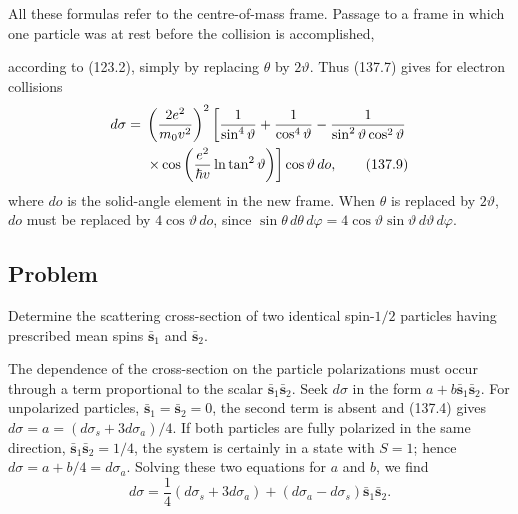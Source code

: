 All these formulas refer to the centre-of-mass frame. Passage to a frame in which one particle was at rest before the collision is accomplished,

according to (123.2), simply by replacing $\theta$ by $2\vartheta$. Thus (137.7) gives for electron collisions
\begin{align}
 d\sigma={}&\left(\frac{2e^2}{m_0v^2}\right)^2
 \left[\frac1{\sin^4\vartheta}+\frac1{\cos^4\vartheta}
 -\frac1{\sin^2\vartheta\cos^2\vartheta}\right.\notag\\
 &\left.\times\cos\left(\frac{e^2}{\hbar v}\ln\tan^2\vartheta\right)\right]
 \cos\vartheta\,d o,
 \tag{137.9}
\end{align}
where $d o$ is the solid-angle element in the new frame. When $\theta$ is replaced by $2\vartheta$, $d o$ must be replaced by $4\cos\vartheta\,d o$, since $\sin\theta\,d\theta\,d\varphi=4\cos\vartheta\sin\vartheta\,d\vartheta\,d\varphi$.

\subsection*{Problem}

Determine the scattering cross-section of two identical spin-$1/2$ particles having prescribed mean spins $\bar{\mathbf s}_1$ and $\bar{\mathbf s}_2$.

\SolutionHeading The dependence of the cross-section on the particle polarizations must occur through a term proportional to the scalar $\bar{\mathbf s}_1\bar{\mathbf s}_2$. Seek $d\sigma$ in the form $a+b\bar{\mathbf s}_1\bar{\mathbf s}_2$. For unpolarized particles, $\bar{\mathbf s}_1=\bar{\mathbf s}_2=0$, the second term is absent and (137.4) gives $d\sigma=a=(d\sigma_s+3d\sigma_a)/4$. If both particles are fully polarized in the same direction, $\bar{\mathbf s}_1\bar{\mathbf s}_2=1/4$, the system is certainly in a state with $S=1$; hence $d\sigma=a+b/4=d\sigma_a$. Solving these two equations for $a$ and $b$, we find
\[
 d\sigma=\frac14(d\sigma_s+3d\sigma_a)+(d\sigma_a-d\sigma_s)\bar{\mathbf s}_1\bar{\mathbf s}_2.
\]
